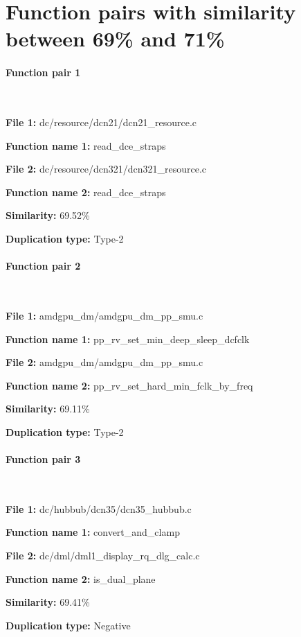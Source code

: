 \section{Function pairs with similarity between 69\% and 71\%}

\paragraph{Function pair 1 }  

\

\textbf{File 1:} dc/resource/dcn21/dcn21\_resource.c

\textbf{Function name 1:} read\_dce\_straps

\textbf{File 2:} dc/resource/dcn321/dcn321\_resource.c

\textbf{Function name 2:} read\_dce\_straps

\textbf{Similarity:} 69.52\%

\textbf{Duplication type:} Type-2


\paragraph{Function pair 2 }  

\

\textbf{File 1:} amdgpu\_dm/amdgpu\_dm\_pp\_smu.c

\textbf{Function name 1:} pp\_rv\_set\_min\_deep\_sleep\_dcfclk

\textbf{File 2:} amdgpu\_dm/amdgpu\_dm\_pp\_smu.c

\textbf{Function name 2:} pp\_rv\_set\_hard\_min\_fclk\_by\_freq

\textbf{Similarity:} 69.11\%

\textbf{Duplication type:} Type-2


\paragraph{Function pair 3 }  

\

\textbf{File 1:} dc/hubbub/dcn35/dcn35\_hubbub.c

\textbf{Function name 1:} convert\_and\_clamp

\textbf{File 2:} dc/dml/dml1\_display\_rq\_dlg\_calc.c

\textbf{Function name 2:} is\_dual\_plane

\textbf{Similarity:} 69.41\%

\textbf{Duplication type:} Negative



